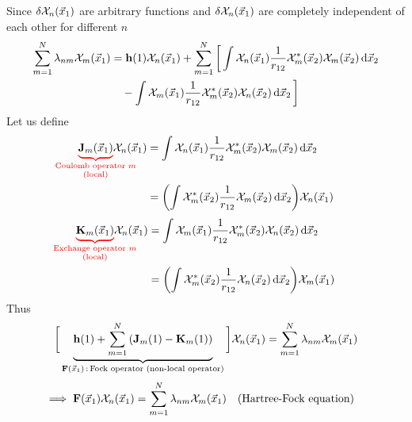 \documentclass[12pt,a4paper,titlepage]{article}
\newcommand{\trm}[1]{\textrm{#1}} %
\newcommand{\Chi}{\mathcal{X}} %
\begin{document}
Since $\var{\Chi_{n}(\vec{x}_{1})}$ are arbitrary functions and $\var{\Chi_{n}(\vec{x}_{1})}$ are completely independent of each other for different $n$
\begin{equation}
\begin{aligned}
\sum_{m=1}^{N}\lambda_{nm}\Chi_{m}(\vec{x}_{1})&=\vb{h}(1)\Chi_{n}(\vec{x}_{1})+\sum_{m=1}^{N}\bigg[\int\Chi_{n}(\vec{x}_{1})\frac{1}{r_{12}}\Chi_{m}^{*}(\vec{x}_{2})\Chi_{m}(\vec{x}_{2})\dd{\vec{x}_{2}}\\
&\quad-\int\Chi_{m}(\vec{x}_{1})\frac{1}{r_{12}}\Chi_{m}^{*}(\vec{x}_{2})\Chi_{n}(\vec{x}_{2})\dd{\vec{x}_{2}}\bigg]
\end{aligned}
\end{equation}
Let us define
\begin{equation}
\begin{aligned}
{\color{red}\underbrace{\color{black}\vb{J}_{m}(\vec{x}_{1})}_{\mathclap{\substack{\trm{Coulomb operator $m$}\\\trm{(local)}}}}}\Chi_{n}(\vec{x}_{1})&=\int\Chi_{n}(\vec{x}_{1})\frac{1}{r_{12}}\Chi_{m}^{*}(\vec{x}_{2})\Chi_{m}(\vec{x}_{2})\dd{\vec{x}_{2}}\\
&=\qty(\int\Chi_{m}^{*}(\vec{x}_{2})\frac{1}{r_{12}}\Chi_{m}(\vec{x}_{2})\dd{\vec{x}_{2}})\Chi_{n}(\vec{x}_{1})
\end{aligned}
\end{equation}
\begin{equation}
\begin{aligned}
{\color{red}\underbrace{\color{black}\vb{K}_{m}(\vec{x}_{1})}_{\mathclap{\substack{\trm{Exchange operator $m$}\\\trm{(local)}}}}}\Chi_{n}(\vec{x}_{1})&=\int\Chi_{m}(\vec{x}_{1})\frac{1}{r_{12}}\Chi_{m}^{*}(\vec{x}_{2})\Chi_{n}(\vec{x}_{2})\dd{\vec{x}_{2}}\\
&=\qty(\int\Chi_{m}^{*}(\vec{x}_{2})\frac{1}{r_{12}}\Chi_{n}(\vec{x}_{2})\dd{\vec{x}_{2}})\Chi_{m}(\vec{x}_{1})
\end{aligned}
\end{equation}
Thus
\begin{equation}
\bigg[\underbrace{\vb{h}(1)+\sum_{m=1}^{N}\qty(\vb{J}_{m}(1)-\vb{K}_{m}(1))}_{\vb{F}(\vec{x}_{1})\,:\,\trm{Fock operator (non-local operator)}}\bigg]\Chi_{n}(\vec{x}_{1})=\sum_{m=1}^{N}\lambda_{nm}\Chi_{m}(\vec{x}_{1})
\end{equation}
\begin{equation}
\implies \vb{F}(\vec{x}_{1})\Chi_{n}(\vec{x}_{1})=\sum_{m=1}^{N}\lambda_{nm}\Chi_{m}(\vec{x}_{1})\qq{(Hartree-Fock equation)}
\end{equation}
\end{document}

